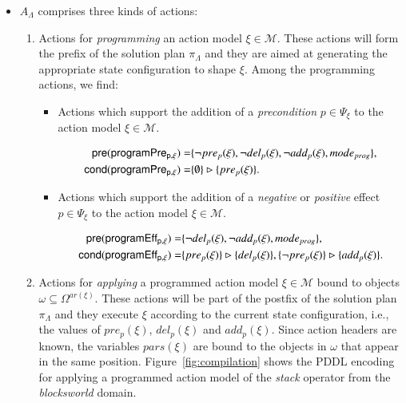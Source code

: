 \begin{itemize}
\item $A_{\Lambda}$ comprises three kinds of actions:
\begin{enumerate}
\item Actions for {\em programming} an action model $\xi\in\mathcal{M}$. These actions will form the prefix of the solution plan $\pi_\Lambda$ and they are aimed at generating the appropriate state configuration to shape $\xi$. Among the programming actions, we find:
\begin{itemize}
\item Actions which support the addition of a {\em precondition} $p\in \Psi_{\xi}$ to the action model $\xi\in\mathcal{M}$.

\begin{small}
\begin{align*}
\hspace*{7pt}\mathsf{pre}(\mathsf{programPre_{p,\xi}})=&\{\neg pre_{p}(\xi), \neg del_{p}(\xi),\neg add_{p}(\xi), mode_{prog}\},\\
\mathsf{cond}(\mathsf{programPre_{p,\xi}})=&\{\emptyset\}\rhd\{pre_{p}(\xi)\}.
\end{align*}
\end{small}

\item Actions which support the addition of a {\em negative} or {\em positive} effect $p\in \Psi_{\xi}$ to the action model $\xi\in\mathcal{M}$.

\begin{small}
\begin{align*}
\hspace*{7pt}\mathsf{pre}(\mathsf{programEff_{p,\xi}})=&\{\neg del_{p}(\xi),\neg add_{p}(\xi), mode_{prog}\},\\
\mathsf{cond}(\mathsf{programEff_{p,\xi}})=&\{pre_{p}(\xi)\}\rhd\{del_{p}(\xi)\},\{\neg pre_{p}(\xi)\}\rhd\{add_{p}(\xi)\}.
\end{align*}
\end{small}
\end{itemize}

\item Actions for {\em applying} a programmed action model $\xi\in\mathcal{M}$ bound to objects $\omega\subseteq\Omega^{ar(\xi)}$. These actions will be part of the postfix of the solution plan $\pi_\Lambda$ and they execute $\xi$ according to the current state configuration, i.e., the values of $pre_p(\xi)$, $del_p(\xi)$ and $add_p(\xi)$. Since action headers are known, the variables $pars(\xi)$ are bound to the objects in $\omega$ that appear in the same position. Figure~\ref{fig:compilation} shows the PDDL encoding for applying a programmed action model of the {\em stack} operator from the {\em blocksworld} domain.



\end{enumerate}
\end{itemize}
